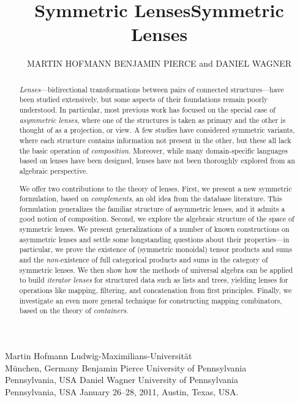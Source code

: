 \documentclass[prodmode,acmjacm]{acmsmall}
\title{Symmetric Lenses}
\author{MARTIN HOFMANN \affil{Ludwig-Maximilians-Universit\"at} BENJAMIN
PIERCE and DANIEL WAGNER \affil{University of Pennsylvania}}
\begin{document}
\title{Symmetric Lenses}
\authorinfo
    {Martin Hofmann}
    {Ludwig-Maximilians-Universit\"at \\ M\"unchen, Germany}
    {}
\authorinfo
    {Benjamin Pierce}
    {University of Pennsylvania \\ Pennsylvania, USA}
    {}
\authorinfo
    {Daniel Wagner}
    {University of Pennsylvania \\ Pennsylvania, USA}
    {}
 {January 26--28, 2011, Austin, Texas, USA.}
\maketitle
\fi

\iftext
\begin{abstract}
{\em Lenses}---bidirectional transformations between pairs of connected
structures---have been studied extensively, but some aspects of their
foundations remain poorly understood.
%
In particular, most previous work has focused on the special case of {\em
  asymmetric lenses}, where one of the structures is taken as primary and
the other is thought of as a projection, or view.  A few studies have
considered symmetric variants, where each structure contains
information not present in the other, but these all 
lack the basic operation of {\em composition}.  Moreover,
while many domain-specific languages based on lenses have been designed,
lenses have not been thoroughly explored from an algebraic
perspective.

We offer two contributions to the theory of lenses.  
%
First, we present a new symmetric formulation, based on {\em complements},
an old idea from the database literature.  This formulation generalizes the
familiar structure of asymmetric lenses, and it admits a good notion of
composition.
Second, we explore the algebraic structure of the space of
symmetric lenses.  We present generalizations of a number of known
constructions on asymmetric lenses and settle some longstanding questions
about their properties---in particular, we prove the existence of (symmetric
monoidal) tensor products and sums and the {\em non-}existence of full
categorical products and sums in the category of symmetric lenses.  We then
show how the methods of universal 
algebra can be applied to build {\em iterator lenses} for structured data
such as lists and trees, yielding lenses for operations like
mapping, filtering, and concatenation from first principles.  Finally, we
investigate an even more general technique for constructing mapping
combinators, based on the theory of {\em containers}.
\end{abstract}
\fi
\end{document}
